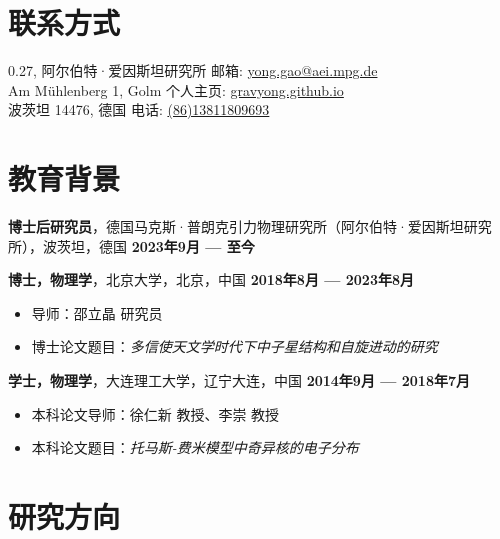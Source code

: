 \documentclass[margin,line]{res_mod}
\begin{document}
\newcommand{\myname}{高勇 --- 个人简历}
\newlength{\mynamewidth}
\settowidth{\mynamewidth}{\namefont\myname}
\name{\hspace*{0.5\textwidth}\hspace{-0.5\mynamewidth} \large{\myname}\vspace*{.1in}}
\thispagestyle{empty}

\begin{resume}

\section{联系方式}
0.27, 阿尔伯特·爱因斯坦研究所      \hfill 邮箱: \href{mailto:gaoyong.physics@pku.edu.cn}{yong.gao@aei.mpg.de}\\
Am Mühlenberg 1, Golm \hfill 个人主页: \href{https://gravyong.github.io/}{gravyong.github.io}\\
波茨坦 14476, 德国                                \hfill 电话: \href{tel:8613811809693}{(86)13811809693}

\section{教育背景}

{\bf 博士后研究员}，德国马克斯·普朗克引力物理研究所（阿尔伯特·爱因斯坦研究所），波茨坦，德国 \hfill {\bf 2023年9月 — 至今} 

{\bf 博士，物理学}，北京大学，北京，中国 \hfill {\bf 2018年8月 — 2023年8月} \\
\vspace*{-.1in}
\begin{itemize}
  \item[ ] 导师：邵立晶 研究员
  \item[ ] 博士论文题目：\textit{多信使天文学时代下中子星结构和自旋进动的研究}
\end{itemize}

{\bf 学士，物理学}，大连理工大学，辽宁大连，中国 \hfill {\bf 2014年9月 — 2018年7月} \\
\vspace*{-.1in}
\begin{itemize}
  \item[ ] 本科论文导师：徐仁新 教授、李崇 教授
  \item[ ] 本科论文题目：\textit{托马斯-费米模型中奇异核的电子分布}
\end{itemize}


\section{研究方向}


\end{resume}
\end{document}
